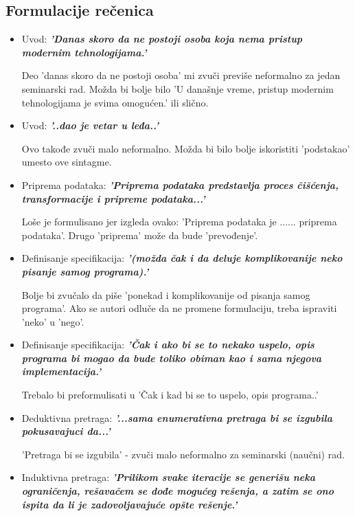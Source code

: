 \documentclass[a4paper]{report}
\begin{document}
\subsection{Formulacije rečenica}
\begin{itemize}
	\item Uvod: \textbf{\textit{'Danas skoro da ne postoji osoba koja nema pristup modernim tehnologijama.'}}

		Deo 'danas skoro da ne postoji osoba' mi zvuči previše neformalno za jedan seminarski rad. Možda bi bolje bilo 'U današnje vreme, pristup modernim tehnologijama je svima omogućen.' ili slično.
        
	\item Uvod: \textbf{\textit{'..dao je vetar u leđa..'}} 
    
    Ovo takođe zvuči malo neformalno. Možda bi bilo bolje iskoristiti 'podstakao' umesto ove sintagme.
    
    \item Priprema podataka: \textbf{\textit{'Priprema podataka predstavlja proces čišćenja, transformacije i pripreme podataka...'}}
    
    Loše je formulisano jer izgleda ovako: 'Priprema podataka je ...... priprema podataka'. Drugo 'priprema' može da bude 'prevođenje'. 
    
    \item Definisanje specifikacija: \textbf{\textit{'(možda čak i da deluje komplikovanije neko pisanje samog programa).'}}
    
    Bolje bi zvučalo da piše 'ponekad i komplikovanije od pisanja samog programa'. Ako se autori odluče da ne promene formulaciju, treba ispraviti 'neko' u 'nego'.
    
    \item Definisanje specifikacija: \textbf{\textit{'Čak i ako bi se to nekako uspelo, opis programa bi mogao da bude toliko obiman kao i sama njegova implementacija.'}}
    
    Trebalo bi preformulisati u 'Čak i kad bi se to uspelo, opis programa..'
    
    \item Deduktivna pretraga: \textbf{\textit{'...sama enumerativna pretraga bi se izgubila pokusavajuci da...'}}
    
    'Pretraga bi se izgubila' - zvuči malo neformalno za seminarski (naučni) rad. 
    
    \item Induktivna pretraga: \textbf{\textit{'Prilikom svake iteracije se generišu neka ograničenja, rešavačem se dođe mogućeg rešenja, a zatim se ono ispita da li je zadovoljavajuće opšte
rešenje.'}}


\end{itemize}
\end{document}
